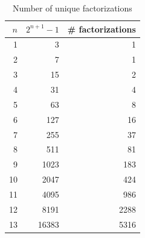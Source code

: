 \documentclass{article}
\begin{document}
    \begin{table}[!h]
            \centering
            \caption{Number of unique factorizations}
            \label{tab:data}    
        \begin{tabular}{|r|r|r|}
            \hline
            $n$ & $2^{n+1}-1$ & \# factorizations \\ \hline
            1 & 3 & 1 \\ \hline 
            2 & 7 & 1 \\ \hline 
            3 & 15 & 2 \\ \hline 
            4 & 31 & 4 \\ \hline 
            5 & 63 & 8 \\ \hline 
            6 & 127 & 16 \\ \hline 
            7 & 255 & 37 \\ \hline 
            8 & 511 & 81 \\ \hline 
            9 & 1023 & 183 \\ \hline 
            10 & 2047 & 424 \\ \hline 
            11 & 4095 & 986 \\ \hline 
            12 & 8191 & 2288 \\ \hline 
            13 & 16383 & 5316 \\ \hline 
        \end{tabular}

    \end{table}
    
\end{document}
